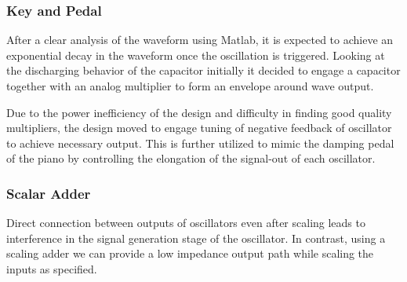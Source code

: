 \documentclass[class=article,crop=false,11pt]{standalone}
\begin{document}
\subsubsection{Key and Pedal}
After a clear analysis of the waveform using Matlab, it is expected to achieve an exponential decay in the waveform once the oscillation is triggered. Looking at the discharging behavior of the capacitor initially it decided to engage a capacitor together with an analog multiplier to form an envelope around wave output. 
\par
Due to the power inefficiency of the design and difficulty in finding good quality multipliers, the design moved to engage tuning of negative feedback of oscillator to achieve necessary output. This is further utilized to mimic the damping pedal of the piano by controlling the elongation of the signal-out of each oscillator.
\subsubsection{Scalar Adder}
Direct connection between outputs of oscillators even after scaling leads to interference in the signal generation stage of the oscillator. In contrast, using a scaling adder we can provide a low impedance output path while scaling the inputs as specified.
\end{document}
